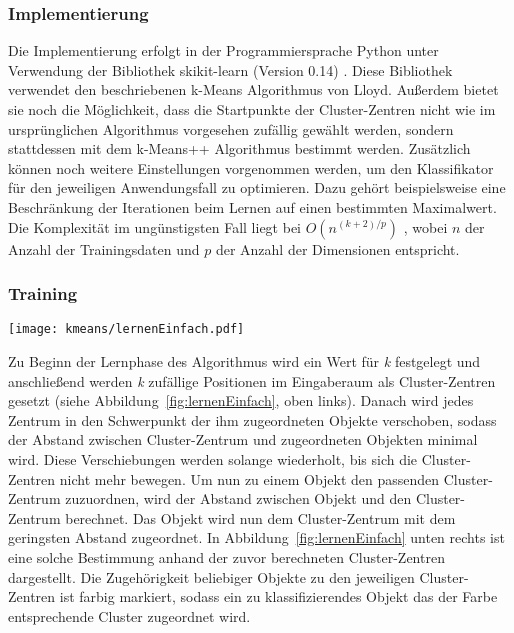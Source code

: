\subsubsection{Implementierung} \label{subsubsec:kMeansImpl}%
Die Implementierung erfolgt in der Programmiersprache Python unter Verwendung der Bibliothek skikit-learn (Version 0.14) \cite{sklearn}. Diese Bibliothek verwendet den beschriebenen k-Means Algorithmus von Lloyd. Außerdem bietet sie noch die Möglichkeit, dass die Startpunkte der Cluster-Zentren nicht wie im ursprünglichen Algorithmus vorgesehen zufällig gewählt werden, sondern stattdessen mit dem k-Means++ Algorithmus \cite{kMeans++} bestimmt werden. Zusätzlich können noch weitere 
Einstellungen vorgenommen werden, um den Klassifikator für den jeweiligen Anwendungsfall  zu optimieren. Dazu gehört beispielsweise eine Beschränkung der Iterationen beim Lernen auf einen bestimmten Maximalwert.
Die Komplexität im ungünstigsten Fall liegt bei $O(n^{(k+2)/p})$ \cite{sklearn.kmeans, kMeansHowSlow}, wobei $n$ der Anzahl der Trainingsdaten und $p$ der Anzahl der Dimensionen entspricht.


\subsubsection{Training} \label{subsubsec:kMeansTraining}

\begin{figure*}[htbp]
    \centering
   \texttt{[image: kmeans/lernenEinfach.pdf]}
\caption{Trainingsphase beim k-Means Algorithmus}
\label{fig:lernenEinfach}

\end{figure*}


Zu Beginn der Lernphase des Algorithmus wird ein Wert für \emph{k} festgelegt und anschließend werden \emph{k} zufällige Positionen im Eingaberaum als Cluster-Zentren gesetzt (siehe Abbildung~\ref{fig:lernenEinfach}, oben links). Danach wird jedes Zentrum in den Schwerpunkt der ihm zugeordneten Objekte verschoben, sodass der Abstand zwischen Cluster-Zentrum und zugeordneten Objekten minimal wird. Diese Verschiebungen werden solange wiederholt, bis sich die Cluster-Zentren nicht mehr bewegen. 
Um nun zu einem Objekt den passenden Cluster-Zentrum zuzuordnen, wird der Abstand zwischen Objekt und den Cluster-Zentrum berechnet. Das Objekt wird nun dem Cluster-Zentrum mit dem geringsten Abstand zugeordnet. In Abbildung~\ref{fig:lernenEinfach} unten rechts ist  eine solche Bestimmung anhand der zuvor berechneten Cluster-Zentren dargestellt. Die Zugehörigkeit beliebiger Objekte zu den jeweiligen Cluster-Zentren ist farbig markiert, sodass ein zu klassifizierendes Objekt das der Farbe entsprechende Cluster zugeordnet wird.

